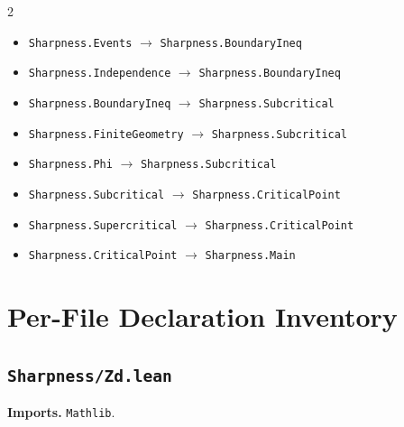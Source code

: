 \documentclass[10pt]{article}
\newcommand{\module}[1]{\texttt{#1}}
\begin{document}
\begin{multicols}{2}
\begin{itemize}
\item \module{Sharpness.Events} \(\to\) \module{Sharpness.BoundaryIneq}
\item \module{Sharpness.Independence} \(\to\) \module{Sharpness.BoundaryIneq}
\item \module{Sharpness.BoundaryIneq} \(\to\) \module{Sharpness.Subcritical}
\item \module{Sharpness.FiniteGeometry} \(\to\) \module{Sharpness.Subcritical}
\item \module{Sharpness.Phi} \(\to\) \module{Sharpness.Subcritical}
\item \module{Sharpness.Subcritical} \(\to\) \module{Sharpness.CriticalPoint}
\item \module{Sharpness.Supercritical} \(\to\) \module{Sharpness.CriticalPoint}
\item \module{Sharpness.CriticalPoint} \(\to\) \module{Sharpness.Main}
\end{itemize}
\end{multicols}
\section*{Per-File Declaration Inventory}
\subsection*{\module{Sharpness/Zd.lean}}
\textbf{Imports.} \module{Mathlib}.
\end{document}
